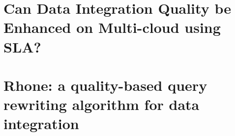 \chapter{Can Data Integration Quality be Enhanced on Multi-cloud using SLA?}
\label{chap:appendix1}



\chapter{Rhone: a quality-based query rewriting algorithm for data integration}
\label{chap:appendix2}


